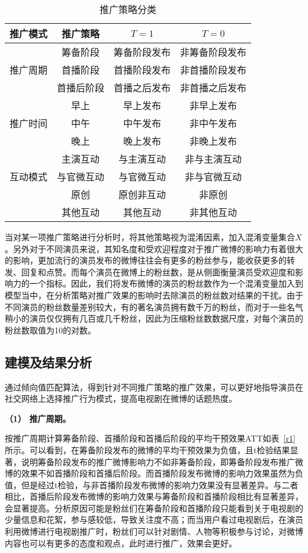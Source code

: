 \begin{table}[!htbp]
\centering
\caption{推广策略分类}
\label{via}
\begin{tabular}{|c|c|c|c|} \hline
推广模式&推广策略&$T=1$&$T=0$\\ \hline
\multirow{3}{*}{推广周期} & 筹备阶段&筹备阶段发布&非筹备阶段发布\\%
&首播阶段&首播阶段发布&非首播阶段发布\\%
&首播后阶段&首播之后发布&非首播之后发布\\ \hline
\multirow{3}{*}{推广时间} &早上&早上发布&非早上发布\\%
&中午&中午发布&非中午发布\\%
&晚上&晚上发布&非晚上发布\\ \hline
\multirow{3}{*}{互动模式} &主演互动&与主演互动&非与主演互动\\%
&与官微互动&与官微互动&非与官微互动\\%
&原创&原创非互动&非原创\\ 
&其他互动&其他互动&非其他互动\\ \hline
\end{tabular}
\end{table}

当对某一项推广策略进行分析时，将其他策略视为混淆因素，加入混淆变量集合$X$。另外对于不同演员来说，其知名度和受欢迎程度对于推广微博的影响力有着很大的影响，更加流行的演员发布的微博往往会有更多的粉丝参与，能收获更多的转发、回复和点赞。而每个演员在微博上的粉丝数，是从侧面衡量演员受欢迎度和影响力的一个指标。因此，我们将发布微博的演员的粉丝数作为一个混淆变量加入到模型当中，在分析策略对推广效果的影响时去除演员的粉丝数对结果的干扰。由于不同演员的粉丝数量差别较大，有的著名演员拥有数千万的粉丝，而对于一些名气稍小的演员仅仅拥有几百或几千粉丝，因此为压缩粉丝数数据尺度，对每个演员的粉丝数取值为10的对数。

\subsection{建模及结果分析}

通过倾向值匹配算法，得到针对不同推广策略的推广效果，可以更好地指导演员在社交网络上选择推广行为模式，提高电视剧在微博的话题热度。

\textbf{（1） 推广周期。}

按推广周期计算筹备阶段、首播阶段和首播后阶段的平均干预效果ATT如表~\ref{r1}所示。可以看到，在筹备阶段发布的微博的平均干预效果为负值，且t检验结果显著，说明筹备阶段发布的推广微博影响力不如非筹备阶段，即筹备阶段发布推广微博的效果不如首播阶段和首播后阶段。而首播阶段发布微博的影响力效果虽然为负值，但是经过t检验，与非首播阶段发布微博的影响力效果没有显著差异。与二者相比，首播后阶段发布微博的影响力效果与筹备阶段和首播阶段相比有显著差异，会显著提高。分析原因可能是粉丝们在筹备阶段和首播阶段只能看到关于电视剧的少量信息和花絮，参与感较低，导致关注度不高；而当用户看过电视剧后，在演员利用微博进行电视剧推广时，粉丝们可以针对剧情、人物等积极参与讨论，对微博内容也可以有更多的态度和观点，此时进行推广，效果会更好。


